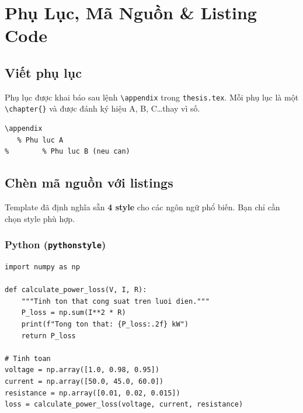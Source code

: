 
\chapter{Phụ Lục, Mã Nguồn \& Listing Code}
\label{ch:code-listing}

\section{Viết phụ lục}

Phụ lục được khai báo sau lệnh \verb|\appendix| trong \texttt{thesis.tex}. Mỗi phụ lục là một \verb|\chapter{}| và được đánh ký hiệu A, B, C\ldots thay vì số.

\begin{lstlisting}[style=latexstyle, caption={Khai báo phụ lục}]
% Trong thesis.tex, sau phan Tai lieu tham khao:
\appendix
   % Phu luc A
%        % Phu luc B (neu can)
\end{lstlisting}

\section{Chèn mã nguồn với listings}

Template đã định nghĩa sẵn \textbf{4 style} cho các ngôn ngữ phổ biến. Bạn chỉ cần chọn style phù hợp.

\subsection{Python (\texttt{pythonstyle})}

\begin{lstlisting}[style=pythonstyle, caption={Ví dụ mã Python --- Tính tổn thất công suất}, label={lst:python-sample}]
import numpy as np

def calculate_power_loss(V, I, R):
    """Tinh ton that cong suat tren luoi dien."""
    P_loss = np.sum(I**2 * R)
    print(f"Tong ton that: {P_loss:.2f} kW")
    return P_loss

# Tinh toan
voltage = np.array([1.0, 0.98, 0.95])
current = np.array([50.0, 45.0, 60.0])
resistance = np.array([0.01, 0.02, 0.015])
loss = calculate_power_loss(voltage, current, resistance)
\end{lstlisting}

